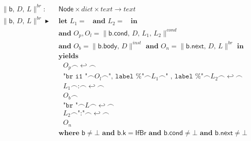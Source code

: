 \documentclass{article}
\newcommand{\trad}[2]{\ensuremath{\lVert \textsf{#1} \rVert^{\textit{#2}}}}
\newcommand{\nl}[0]{\ensuremath{\hookleftarrow}}
\DeclareMathOperator{\conc}{\smallfrown}
\DeclareMathOperator{\isdef}{\blacktriangleright}
\DeclareMathOperator{\name}{\mathcal{L}()}
\begin{document}
\begin{framed}
\begin{align}
\begin{split}
  \trad{b, $D$, $L$}{br} : & \textsf{ Node} \times dict \times text \rightarrow text \\
  \trad{b, $D$, $L$}{br} \isdef 
  & \textbf{ let } L_1 = \name \textbf{ and } L_2 = \name \textbf{ in}  \\
  & \textbf{ and } O_p, O_l = \trad{b.cond, $D$, $L_1$, $L_2$}{cond}  \\
  & \textbf{ and } O_b = \trad{b.body, $D$}{inst} \textbf{ and }
  O_n = \trad{b.next, $D$, $L$}{br} \textbf{ in}  \\
  & \textbf{ yields }  \\
  & \quad O_p \conc \nl \conc  \\
  & \quad \texttt{"br i1 "} \conc O_l \conc \texttt{", label \%"} \conc L_1 \conc \texttt{" , label \%"} \conc L_2 \conc \nl \conc  \\
  & \quad L_1 \conc \texttt{:} \conc \nl \conc  \\
  & \quad O_b \conc  \\
  & \quad \texttt{"br "} \conc L \conc \nl \conc  \\
  & \quad L_2 \conc \texttt{":"} \conc \nl \conc  \\
  & \quad O_n  \\
  & \textbf{ where } \textsf{b} \ne \bot \textbf{ and } \textsf{b.k} = \textsf{IfBr} \textbf{ and } \textsf{b.cond} \ne \bot \textbf{ and } \textsf{b.next} \ne \bot 
\end{split}
\end{align}
\end{framed}
\end{document}
